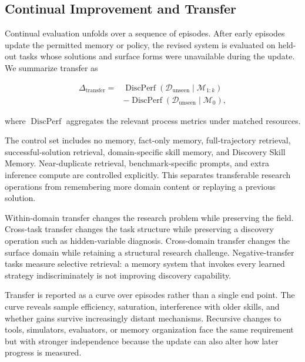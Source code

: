 \documentclass[11pt, a4paper, copyright]{google}
\begin{document}
\subsection{Continual Improvement and Transfer}
\label{subsec:evaluating-transfer}

Continual evaluation unfolds over a sequence of episodes. After early episodes update the permitted memory or policy, the revised system is evaluated on held-out tasks whose solutions and surface forms were unavailable during the update. We summarize transfer as

\begin{equation}
\begin{aligned}
\Delta_{\mathrm{transfer}}
={}&\operatorname{DiscPerf}(\mathcal{D}_{\mathrm{unseen}}\mid\mathcal{M}_{1:k})\\
&-\operatorname{DiscPerf}(\mathcal{D}_{\mathrm{unseen}}\mid\mathcal{M}_{0}),
\end{aligned}
\label{eq:evaluation-transfer}
\end{equation}

where $\operatorname{DiscPerf}$ aggregates the relevant process metrics under matched resources.

The control set includes no memory, fact-only memory, full-trajectory retrieval, successful-solution retrieval, domain-specific skill memory, and Discovery Skill Memory. Near-duplicate retrieval, benchmark-specific prompts, and extra inference compute are controlled explicitly. This separates transferable research operations from remembering more domain content or replaying a previous solution.

Within-domain transfer changes the research problem while preserving the field. Cross-task transfer changes the task structure while preserving a discovery operation such as hidden-variable diagnosis. Cross-domain transfer changes the surface domain while retaining a structural research challenge. Negative-transfer tasks measure selective retrieval: a memory system that invokes every learned strategy indiscriminately is not improving discovery capability.

Transfer is reported as a curve over episodes rather than a single end point. The curve reveals sample efficiency, saturation, interference with older skills, and whether gains survive increasingly distant mechanisms. Recursive changes to tools, simulators, evaluators, or memory organization face the same requirement but with stronger independence because the update can also alter how later progress is measured.
\end{document}
